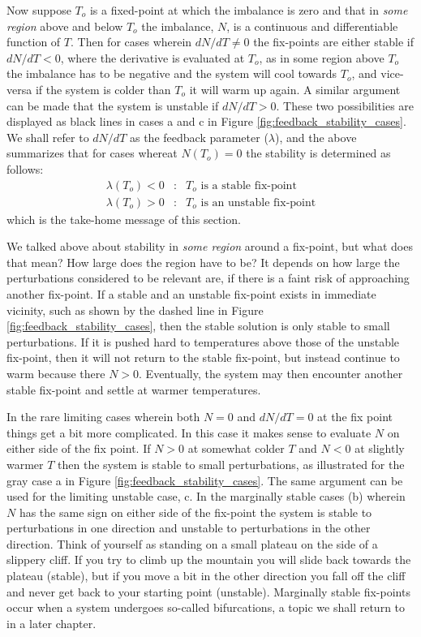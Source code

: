 \documentclass[12pt]{book}
\begin{document}
Now suppose $T_o$ is a fixed-point at which the imbalance is zero and that in {\em some region} above and below $T_o$ the imbalance, $N$, is a continuous and differentiable function of $T$. Then for cases wherein $dN/dT \ne 0$ the fix-points are either stable if $dN/dT < 0$, where the derivative is evaluated at $T_o$, as in some region above $T_o$ the imbalance has to be negative and the system will cool towards $T_o$, and vice-versa if the system is colder than $T_o$ it will warm up again. A similar argument can be made that the system is unstable if $dN/dT > 0$. These two possibilities are displayed as black lines in cases a and c in Figure \ref{fig:feedback_stability_cases}. We shall refer to $dN/dT$ as the feedback parameter ($\lambda$), and the above summarizes that for cases whereat $N(T_o) = 0$ the stability is determined as follows:
\begin{eqnarray}
\lambda(T_o) < 0&:& T_o \textrm{ is a stable fix-point} \nonumber \\  
\lambda(T_o) > 0&:& T_o \textrm{ is an unstable fix-point} \nonumber
\end{eqnarray}
which is the take-home message of this section.

We talked above about stability in {\em some region} around a fix-point, but what does that mean? How large does the region have to be? It depends on how large the perturbations considered to be relevant are, if there is a faint risk of approaching another fix-point. If a stable and an unstable fix-point exists in immediate vicinity, such as shown by the dashed line in Figure \ref{fig:feedback_stability_cases}, then the stable solution is only stable to small perturbations. If it is pushed hard to temperatures above those of the unstable fix-point, then it will not return to the stable fix-point, but instead continue to warm because there $N>0$. Eventually, the system may then encounter another stable fix-point and settle at warmer temperatures. 

In the rare limiting cases wherein both $N=0$ and $dN/dT = 0$ at the fix point things get a bit more complicated. In this case it makes sense to evaluate $N$ on either side of the fix point. If $N>0$ at somewhat colder $T$ and $N<0$ at slightly warmer $T$ then the system is stable to small perturbations, as illustrated for the gray case a in Figure \ref{fig:feedback_stability_cases}. The same argument can be used for the limiting unstable case, c. In the marginally stable cases (b) wherein $N$ has the same sign on either side of the fix-point the system is stable to perturbations in one direction and unstable to perturbations in the other direction. Think of yourself as standing on a small plateau on the side of a slippery cliff. If you try to climb up the mountain you will slide back towards the plateau (stable), but if you move a bit in the other direction you fall off the cliff and never get back to your starting point (unstable). Marginally stable fix-points occur when a system undergoes so-called bifurcations, a topic we shall return to in a later chapter.
\end{document}

